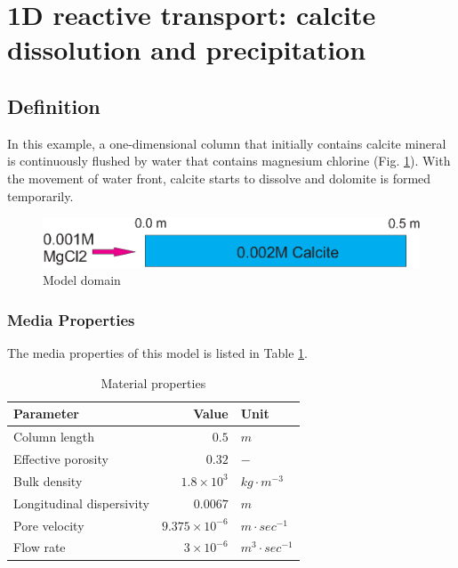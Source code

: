 \section[Calcite dissolution and precipitation (1D)]{1D reactive transport: calcite dissolution and precipitation}

\subsection{Definition}
In this example, a one-dimensional column that initially contains
calcite mineral is continuously flushed by water that contains magnesium
chlorine (Fig. \ref{c:cal_dom}). With the movement of water front,
calcite starts to dissolve and dolomite is formed temporarily.
\begin{figure}[!htb]
  \begin{center}
    \includegraphics[scale=0.5]{PART_III/HC/calcite_domain.eps}
  \end{center}
  \caption{Model domain}
  \label{c:cal_dom}
\end{figure}
\subsubsection*{Media Properties}
The media properties of this model is listed in Table \ref{tab:c_calcite_mp}.

 \begin{table}[H]
  \begin{center}
  \caption{Material properties} %
  \begin{tabular}{lrl}
\hline\noalign{\smallskip}
  \hline
 Parameter & Value & Unit \\
  \hline
 Column length & $0.5$ & $m$ \\
 Effective porosity & $0.32$ & $-$ \\
 Bulk density & $1.8\times10^{3}$ & $kg \cdot m^{-3}$ \\
 Longitudinal dispersivity & $0.0067$ & $m$ \\
 Pore velocity & $9.375\times10^{-6}$ & $m \cdot sec^{-1}$ \\
 Flow rate & $3\times10^{-6}$ & $m^{3} \cdot sec^{-1}$ \\
  \hline
  \hline
  \end{tabular}
  \label{tab:c_calcite_mp}
  \end{center}
  \end{table}

